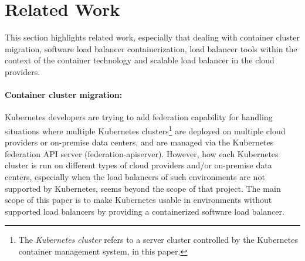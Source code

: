\section{Related Work}\label{Related Work}

This section highlights related work, especially that dealing with container cluster migration, 
software load balancer containerization, load balancer tools within the context of the container technology and scalable load balancer in the cloud providers.

\paragraph{\bf Container cluster migration:}

Kubernetes developers are trying to add federation\cite{K8sFederation2017} capability for handling situations 
where multiple Kubernetes clusters\footnote{The {\em Kubernetes cluster} refers to a server cluster 
controlled by the Kubernetes container management system, in this paper.} 
are deployed on multiple cloud providers or on-premise data centers, 
and are managed via the Kubernetes federation API server (federation-apiserver). 
However, how each Kubernetes cluster is run on different types of cloud providers
and/or on-premise data centers, especially when the load balancers of such environments are not supported by Kubernetes, 
seems beyond the scope of that project. 
The main scope of this paper is to make Kubernetes usable in environments 
without supported load balancers by providing a containerized software load balancer.

